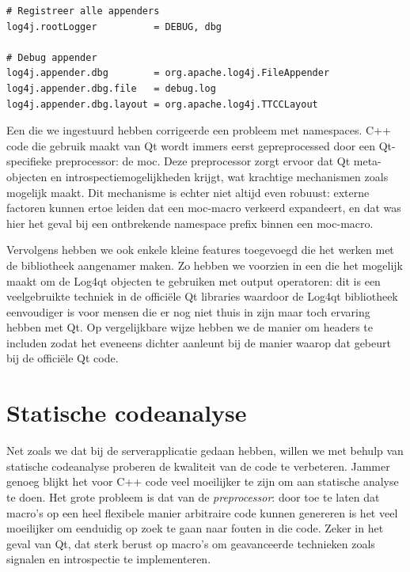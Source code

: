 \begin{lstlisting}[language=JavaProperties, float, caption=Externe configuratie van Log4qt., label=lst:log4qt]
# Registreer alle appenders
log4j.rootLogger          = DEBUG, dbg

# Debug appender
log4j.appender.dbg        = org.apache.log4j.FileAppender
log4j.appender.dbg.file   = debug.log
log4j.appender.dbg.layout = org.apache.log4j.TTCCLayout
\end{lstlisting}

Een  die we ingestuurd hebben corrigeerde een probleem met namespaces. C++ code die gebruik maakt van Qt wordt immers eerst gepreprocessed door een Qt-specifieke preprocessor: de \ac{moc}. Deze preprocessor zorgt ervoor dat Qt meta-objecten en introspectiemogelijkheden krijgt, wat krachtige mechanismen zoals  mogelijk maakt. Dit mechanisme is echter niet altijd even robuust: externe factoren kunnen ertoe leiden dat een \ac{moc}-macro verkeerd expandeert, en dat was hier het geval bij een ontbrekende namespace prefix binnen een  \ac{moc}-macro.

Vervolgens hebben we ook enkele kleine features toegevoegd die het werken met de bibliotheek aangenamer maken. Zo hebben we voorzien in een  die het mogelijk maakt om de Log4qt objecten te gebruiken met output operatoren: dit is een veelgebruikte techniek in de officiële Qt libraries waardoor de Log4qt bibliotheek eenvoudiger is voor mensen die er nog niet thuis in zijn maar toch ervaring hebben met Qt. Op vergelijkbare wijze hebben we de manier om headers te includen  zodat het eveneens dichter aanleunt bij de manier waarop dat gebeurt bij de officiële Qt code.

\section{Statische codeanalyse}
\label{kiosk:realisatie:codeanalyse}

Net zoals we dat bij de serverapplicatie gedaan hebben, willen we met behulp van statische codeanalyse proberen de kwaliteit van de code te verbeteren. Jammer genoeg blijkt het voor C++ code veel moeilijker te zijn om aan statische analyse te doen. Het grote probleem is dat van de \emph{preprocessor}: door toe te laten dat macro's op een heel flexibele manier arbitraire code kunnen genereren is het veel moeilijker om eenduidig op zoek te gaan naar fouten in die code. Zeker in het geval van Qt, dat sterk berust op macro's om geavanceerde technieken zoals signalen en introspectie te implementeren.

